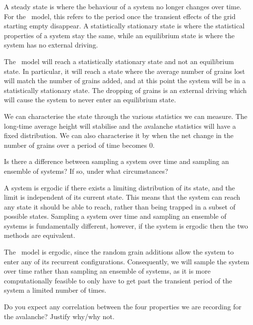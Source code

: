 A steady state is where the behaviour of a system no longer changes over time. For the \btw\ model, this refers to the period once the transient effects of the grid starting empty disappear. A statistically stationary state is where the statistical properties of a system stay the same, while an equilibrium state is where the system has no external driving.

The \btw\ model will reach a statistically stationary state and not an equilibrium state. In particular, it will reach a state where the average number of grains lost will match the number of grains added, and at this point the system will be in a statistically stationary state. The dropping of grains is an external driving which will cause the system to never enter an equilibrium state.

We can characterise the state through the various statistics we can measure. The long-time average height will stabilise and the avalanche statistics will have a fixed distribution. We can also characterise it by when the net change in the number of grains over a period of time becomes $0$.


\begin{question}
    Is there a difference between sampling a system over time and sampling an ensemble of systems? If so, under what circumstances?
\end{question}

A system is ergodic if there exists a limiting distribution of its state, and the limit is independent of its current state. This means that the system can reach any state it should be able to reach, rather than being trapped in a subset of possible states. Sampling a system over time and sampling an ensemble of systems is fundamentally different, however, if the system is ergodic then the two methods are equivalent. 

The \btw\ model is ergodic, since the random grain additions allow the system to enter any of its recurrent configurations. Consequently, we will sample the system over time rather than sampling an ensemble of systems, as it is more computationally feasible to only have to get past the transient period of the system a limited number of times.





\begin{question}
    Do you expect any correlation between the four properties we are recording for the avalanche? Justify why/why not.
\end{question}

